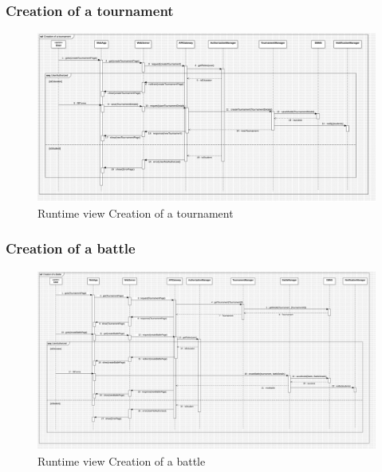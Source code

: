 \begin{itemize}
\subsubsection*{Creation of a tournament}
\begin{figure}[H]
    \centering
    \includegraphics[width=\textwidth]{Diagrams/CreationTournamentSD.jpg}
    \caption{Runtime view Creation of a tournament}
    \label{fig:runtime_view_tournament_creation}
\end{figure}

\subsubsection*{Creation of a battle}
\begin{figure}[H]
    \centering
    \includegraphics[width=\textwidth]{Diagrams/CreationBattleSD.jpg}
    \caption{Runtime view Creation of a battle}
    \label{fig:runtime_view_battle_creation}
\end{figure}

\end{itemize}
